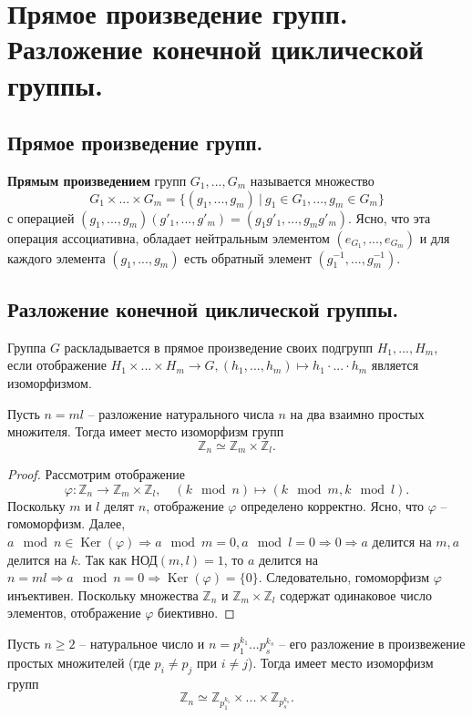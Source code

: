 \section{Прямое произведение групп. Разложение конечной циклической группы.}

\subsection{Прямое произведение групп.}
\begin{definition}
    \textbf{Прямым произведением} групп $G_1, ..., G_m$ называется множество
    \[
        G_1 \times ... \times G_m = \{ (g_1, ..., g_m) \> | \> g_1 \in G_1, ..., g_m \in G_m \}
    \]
    с операцией $(g_1, ..., g_m)(g'_1, ..., g'_m) = (g_1g'_1, ..., g_mg'_m)$.
    Ясно, что эта операция ассоциативна, обладает нейтральным элементом $(e_{G_1}, ..., e_{G_m})$ и для каждого элемента $(g_1, ..., g_m)$ есть обратный элемент $(g_1^{-1}, ..., g_m^{-1})$.
\end{definition}

\subsection{Разложение конечной циклической группы.}
\begin{definition}
    Группа $G$ раскладывается в прямое произведение своих подгрупп $H_1, ..., H_m$, если отображение $H_1 \times ... \times H_m \to G, (h_1, ..., h_m) \mapsto h_1 \cdot ... \cdot h_m$ является изоморфизмом.
\end{definition}
\begin{theorem}
    Пусть $n = ml$ -- разложение натурального числа $n$ на два взаимно простых множителя. Тогда имеет место изоморфизм групп
    \[
        \mathbb{Z}_n \simeq \mathbb{Z}_m \times \mathbb{Z}_l.
    \]
    \begin{proof}
        Рассмотрим отображение
        \[
            \varphi : \mathbb{Z}_n \to \mathbb{Z}_m \times \mathbb{Z}_l,
            \quad
            (k \mod n) \mapsto (k \mod m, k \mod l).
        \]
        Поскольку $m$ и $l$ делят $n$, отображение $\varphi$ определено корректно. Ясно, что $\varphi$ -- гомоморфизм.
        \newline
        Далее, $a \mod n \in \operatorname{Ker}(\varphi) \Rightarrow a \mod m = 0, a \mod l = 0 \Rightarrow 0 \Rightarrow a $ делится на $ m, a $ делится на $ k$.
        Так как НОД$(m, l) = 1$, то $a$ делится на $n = ml \Rightarrow a \mod n = 0 \Rightarrow \operatorname{Ker}(\varphi) = \{0\}$. Следовательно, гомоморфизм $\varphi$ инъективен. Поскольку множества $\mathbb{Z}_n$ и $\mathbb{Z}_m \times \mathbb{Z}_l$ содержат одинаковое число элементов, отображение $\varphi$ биективно.
    \end{proof}
\end{theorem}
\begin{consequence}
    Пусть $n \geqslant 2$ -- натуральное число и $n = p_1^{k_1} ... p_s^{k_s}$ -- его разложение в произвежение простых множителей (где $p_i \neq p_j$ при $i \neq j$). Тогда имеет место изоморфизм групп
    \[
        \mathbb{Z}_n \simeq \mathbb{Z}_{p_1^{k_1}} \times ... \times \mathbb{Z}_{p_s^{k_s}}.
    \]
\end{consequence}